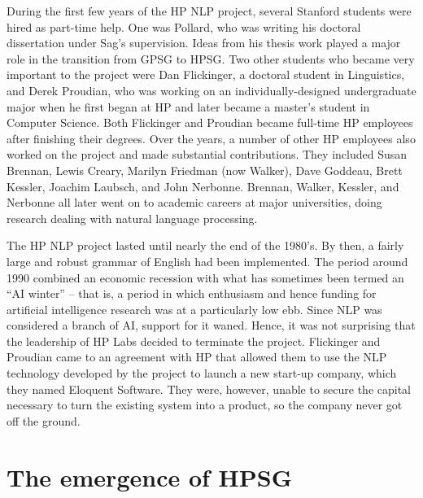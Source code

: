 \documentclass[output=paper]{langsci/langscibook}
\begin{document}
During the first few years of the HP NLP project, several Stanford students were hired as part-time help.   One was Pollard, who was writing his doctoral dissertation under Sag's supervision.  Ideas from his thesis work played a major role in the transition from GPSG to HPSG.  Two other students who became very important to the project were Dan Flickinger, a doctoral student in Linguistics, and Derek Proudian, who was working on an individually-designed undergraduate major when he first began at HP and later became a master's student in Computer Science.  Both Flickinger and Proudian became full-time HP employees after finishing their degrees.   Over the years, a number of other HP employees also worked on the project and made substantial contributions.  They included Susan Brennan, Lewis Creary, Marilyn Friedman (now Walker), Dave Goddeau, Brett Kessler, Joachim Laubsch, and John Nerbonne.  Brennan, Walker, Kessler, and Nerbonne all later went on to academic careers at major universities, doing research dealing with natural language processing.

The HP NLP project lasted until nearly the end of the 1980's.  By then, a fairly large and robust grammar of English had been implemented.  The period around 1990 combined an economic recession with what has sometimes been termed an ``AI winter'' -- that is, a period in which enthusiasm and hence funding for artificial intelligence research was at a particularly low ebb.  Since NLP was considered a branch of AI, support for it waned.  Hence, it was not surprising that the leadership of HP Labs decided to terminate the project.  Flickinger and Proudian came to an agreement with HP that allowed them to use the NLP technology developed by the project to launch a new start-up company, which they named Eloquent Software.  They were, however, unable to secure the capital necessary to turn the existing system into a product, so the company never got off the ground.

\section{The emergence of HPSG}
\end{document}
